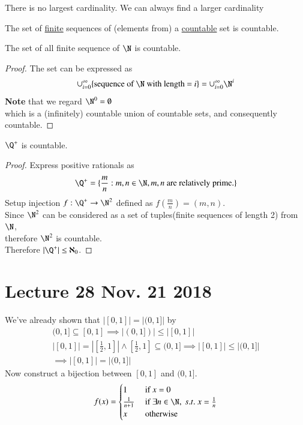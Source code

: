 \documentclass[10pt]{article}
\begin{document}
		\begin{remark}
			There is no largest cardinality. We can always find a larger cardinality 
		\end{remark}
		
		\begin{theorem}
			The set of \ul{finite} sequences of (elements from) a \ul{countable} set is countable.
		\end{theorem}
		
		\begin{example}
			The set of all finite sequence of $\N$ is countable.
			\begin{proof}
				The set can be expressed as 
				\[
					\cup_{i=0}^{\infty} \{\tx{sequence of } \N \tx{ with length = }i\} = \cup_{i=0}^\infty \N^i
				\]
				\textbf{Note} that we regard $\N^0 = \emptyset$ \\
				which is a (infinitely) countable union of countable sets, and consequently countable. 
			\end{proof}
		\end{example}
		
		\begin{example}
			$\Q^+$ is countable.
			\begin{proof}
				Express positive rationals as 
				\[
					\Q^+ = \{\frac{m}{n}:m, n \in \N, m, n \tx{ are relatively prime.}\}
				\]
				Setup injection $f: \Q^+ \to \N^2$ defined as $f(\frac{m}{n}) = (m,n)$. \\
				Since $\N^2$ can be considered as a set of tuples(finite sequences of length 2) from $\N$,\\
				therefore $\N^2$ is countable. \\
				Therefore $|\Q^+| \leq \aleph_0$.
			\end{proof}
		\end{example}
		
	\section{Lecture 28 Nov. 21 2018}
		\begin{example}
			We've already shown that $|[0,1]| = |(0,1]|$ by
			\begin{gather*}
				(0,1] \subseteq [0,1] \implies |(0,1])| \leq |[0,1]| \\
				|[0,1]| = |[\frac{1}{2}, 1]| \land [\frac{1}{2}, 1] \subseteq (0, 1] \implies |[0, 1]| \leq |(0, 1]| \\
				\implies |[0, 1]| = |(0,1]|
			\end{gather*}
			Now construct a bijection between $[0, 1]$ and $(0, 1]$.\\
			\begin{equation}
				f(x) = \begin{cases}
					1 &\tx{ if } x = 0 \\
					\frac{1}{n+1} &\tx{ if } \exists n \in \N,\ s.t.\ x = \frac{1}{n} \\
					x &\tx{ otherwise}
				\end{cases}
			\end{equation}
		\end{example}
		
\end{document}

